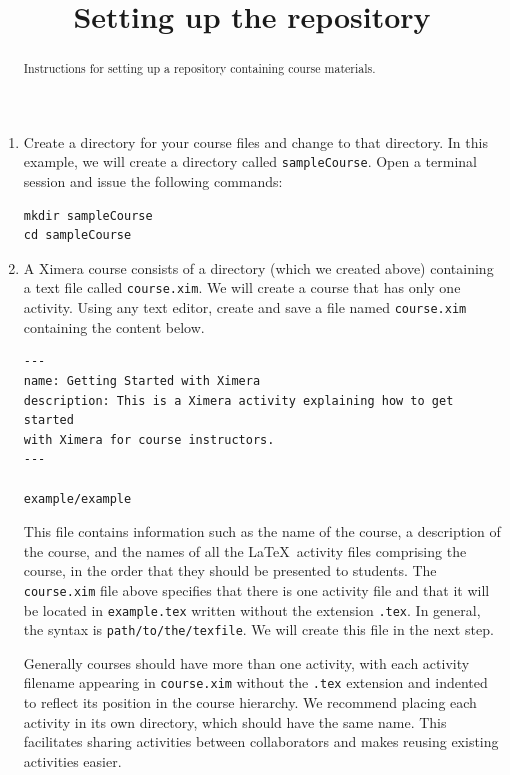 \documentclass{ximera}
\title{Setting up the repository}
\begin{document}
\begin{abstract}
Instructions for setting up a repository containing course materials.
\end{abstract}
\maketitle


\begin{enumerate}
\item Create a directory for your course files
and change to that directory.
In this example, we will create a directory called \verb!sampleCourse!.
Open a terminal session and issue the following commands:
\begin{center}
\begin{verbatim}
mkdir sampleCourse
cd sampleCourse 
\end{verbatim}
\end{center}
\item A Ximera course consists of a directory (which we created above)
containing a text file called \verb!course.xim!. 
We will create a course that has only one activity.
Using any text editor,
create and save a file named
\verb!course.xim! containing the content below.

\begin{verbatim}
---
name: Getting Started with Ximera
description: This is a Ximera activity explaining how to get started
with Ximera for course instructors.
---

example/example
\end{verbatim}

\begin{remark}
This file contains information such as
the name of the course, a description of the course,
and the names of all the \LaTeX\ activity files 
comprising the course, in the order
that they should be presented to students.
The \verb!course.xim! file above specifies that 
there is one activity file 
and that it will be located in \verb!example.tex!
written without the extension \verb!.tex!. 
In general, the syntax is \verb!path/to/the/texfile!.
We will
create this file in the next step.

Generally courses should have more than one activity,
with each activity filename appearing in \verb!course.xim!
without the \verb!.tex! extension and
indented to reflect its position in the course hierarchy.
We recommend placing each
activity in its own directory, which should have the same name.
This facilitates
sharing activities between collaborators and makes reusing existing
activities easier.
\end{remark}


\end{enumerate}
\end{document}
